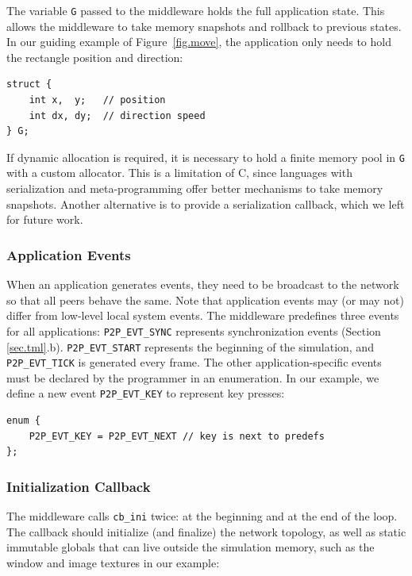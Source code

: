 \documentclass[12pt]{article}
\newcommand{\code}[1]  {\texttt{\small{#1}}}
\begin{document}
The variable \code{G} passed to the middleware holds the full application
state.
This allows the middleware to take memory snapshots and rollback to previous
states.
In our guiding example of Figure~\ref{fig.move}, the application only needs to
hold the rectangle position and direction:

{\footnotesize
\begin{verbatim}
struct {
    int x,  y;   // position
    int dx, dy;  // direction speed
} G;
\end{verbatim}
}

If dynamic allocation is required, it is necessary to hold a finite memory
pool in \code{G} with a custom allocator.
This is a limitation of C, since languages with serialization and
meta-programming offer better mechanisms to take memory snapshots.
Another alternative is to provide a serialization callback, which we left for
future work.

\subsubsection{Application Events}
\label{sec.tml.api.events}

When an application generates events, they need to be broadcast to the network
so that all peers behave the same.
Note that application events may (or may not) differ from low-level local
system events.
%
The middleware predefines three events for all applications:
    \code{P2P\_EVT\_SYNC} represents synchronization events
        (Section \ref{sec.tml}.b).
    \code{P2P\_EVT\_START} represents the beginning of the simulation, and
    \code{P2P\_EVT\_TICK} is generated every frame.
The other application-specific events must be declared by the programmer in an
enumeration.
In our example, we define a new event \code{P2P\_EVT\_KEY} to represent key
presses:

{\footnotesize
\begin{verbatim}
enum {
    P2P_EVT_KEY = P2P_EVT_NEXT // key is next to predefs
};
\end{verbatim}
}

\subsubsection{Initialization Callback}
\label{sec.tml.api.cb_ini}

The middleware calls \code{cb\_ini} twice: at the beginning and at the end of
the loop.
The callback should initialize (and finalize) the network topology, as well as
static immutable globals that can live outside the simulation memory, such as
the window and image textures in our example:
\end{document}
